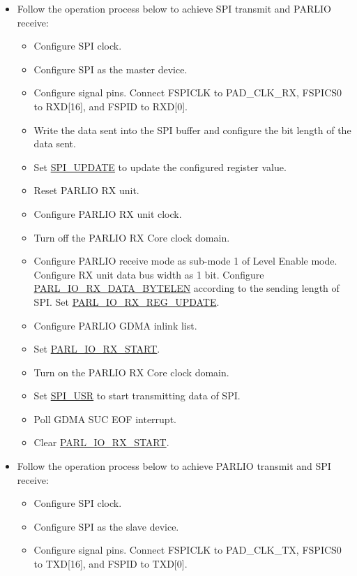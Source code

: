 \documentclass[main\_\_EN.tex]{subfiles}
\begin{document}
\begin{itemize}
    \item Follow the operation process below to achieve SPI transmit and PARLIO receive:
    \begin{itemize}
        \item Configure SPI clock.
        \item Configure SPI as the master device.
        \item Configure signal pins. Connect FSPICLK to PAD\_CLK\_RX, FSPICS0 to RXD[16], and FSPID to RXD[0]. 
        \item Write the data sent into the SPI buffer and configure the bit length of the data sent.
        \item Set \hyperref[fielddesc:SPIUPDATE]{SPI\_UPDATE} to update the configured register value.
        \item Reset PARLIO RX unit.
        \item Configure PARLIO RX unit clock.
        \item Turn off the PARLIO RX Core clock domain.
        \item Configure PARLIO receive mode as sub-mode 1 of Level Enable mode. Configure RX unit data bus width as 1 bit. Configure \hyperref[fielddesc:PARLIORXDATABYTELEN]{PARL\_IO\_RX\_DATA\_BYTELEN} according to the sending length of SPI. Set \hyperref[fielddesc:PARLIORXREGUPDATE]{PARL\_IO\_RX\_REG\_UPDATE}.
        \item Configure PARLIO GDMA inlink list.
        \item Set \hyperref[fielddesc:PARLIORXSTART]{PARL\_IO\_RX\_START}.
        \item Turn on the PARLIO RX Core clock domain.
        \item Set \hyperref[fielddesc:SPIUSR]{SPI\_USR} to start transmitting data of SPI.
        \item Poll GDMA SUC EOF interrupt.
        \item Clear \hyperref[fielddesc:PARLIORXSTART]{PARL\_IO\_RX\_START}.  
    \end{itemize} 
    \item Follow the operation process below to achieve PARLIO transmit and SPI receive:
    \begin{itemize}
        \item Configure SPI clock.
        \item Configure SPI as the slave device.
        \item Configure signal pins. Connect FSPICLK to PAD\_CLK\_TX, FSPICS0 to TXD[16], and FSPID to TXD[0]. 

\end{itemize}
\end{itemize}
\end{document}

